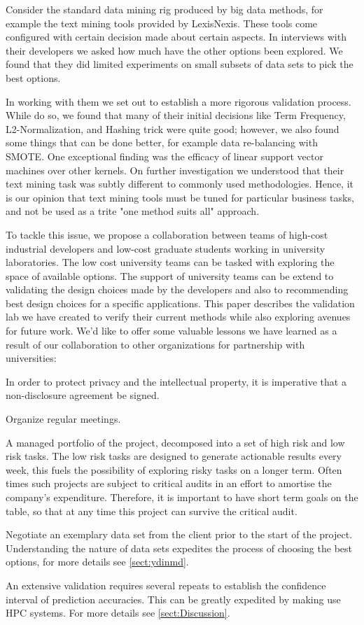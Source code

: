 \documentclass{sig-alternate-05-2015}
\newcommand{\bi}{\begin{itemize*}}
\newcommand{\ei}{\end{itemize*}}
\newcommand{\tion}[1]{\textsection\ref{sect:#1}}
\begin{document}
Consider the standard data mining rig produced by big data methods, for example the text mining tools provided by LexisNexis. These tools come configured with certain decision made about certain aspects. In interviews with their developers we asked how much have the other options been explored. We found that they did limited experiments on small subsets of data sets to pick the best options. 

In working with them we set out to establish a more rigorous validation process. While do so, we found that many of their initial decisions like Term Frequency, L2-Normalization, and Hashing trick were quite good; however, we also found some things that can be done better, for example data re-balancing with SMOTE. One exceptional finding was the efficacy of linear support vector machines over other kernels. On further investigation we understood that their text mining task was subtly different to commonly used methodologies. Hence, it is our opinion that text mining tools must be tuned for particular business tasks, and not be used as a trite "one method suits all" approach. 

To tackle this issue, we propose a collaboration between teams of high-cost industrial developers and low-cost graduate students working in university laboratories. The low cost university teams can be tasked with exploring the space of available options. The support of university teams can be extend to validating the design choices made by the developers and also to recommending best design choices for a specific applications. This paper describes the validation lab we have created to verify their current methods while also exploring avenues for future work. We'd like to offer some valuable lessons we have learned as a result of our collaboration to other organizations for partnership with universities:

\bi
\item In order to protect privacy and the intellectual property, it is imperative that a non-disclosure agreement be signed.
\item Organize regular meetings.
\item A managed portfolio of the project, decomposed into a set of high risk and low risk tasks. The low risk tasks are designed to generate actionable results every week, this fuels the possibility of exploring risky tasks on a longer term. Often times such projects are subject to critical audits in an effort to amortise the company's expenditure. Therefore, it is important to have short term goals on the table, so that at any time this project can survive the critical audit. 
\item Negotiate an exemplary data set from the client prior to the start of the project. Understanding the nature of data sets expedites the process of choosing the best options, for more details see \tion{ydinmd}.
\item An extensive validation requires several repeats to establish the confidence interval of prediction accuracies. This can be greatly expedited by making use HPC systems. For more details see \tion{Discussion}.
\ei
\end{document}
